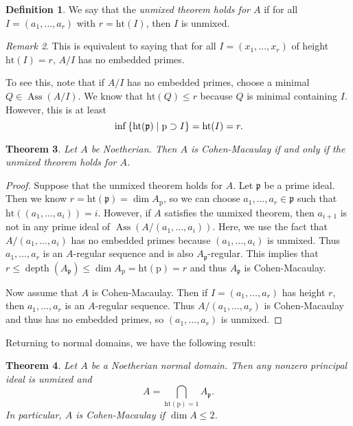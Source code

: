 \documentclass[leqno, openany]{memoir}
\newtheorem{thm}{Theorem}[section]
\theoremstyle{definition}
\newtheorem{defn}[thm]{Definition}
\theoremstyle{remark}
\newtheorem{rmk}[thm]{Remark}
\theoremstyle{plain}
\theoremstyle{definition}
\theoremstyle{remark}
\newcommand{\mf}[1]{\mathfrak{#1}}
\newcommand{\mr}[1]{\mathrm{#1}}
\DeclareMathOperator{\Ass}{Ass}
\DeclareMathOperator{\dpth}{depth}
\begin{document}
\begin{defn}
    We say that the \textit{unmixed theorem holds for $A$} if for all $I = (a_1, \ldots, a_r)$ with $r = \mr{ht}(I)$, then $I$ is unmixed. 
\end{defn}

\begin{rmk}
    This is equivalent to saying that for all $I = (x_1, \ldots, x_r)$ of height $\mr{ht}(I) = r$, $A/I$ has no embedded primes.

    To see this, note that if $A/I$ has no embedded primes, choose a minimal $Q \in \Ass(A/I)$. We know that $\mr{ht}(Q) \leq r$ because $Q$ is minimal containing $I$. However, this is at least
    \[ \inf \qty{ \mr{ht}(\mf{p}) \mid \mr{p} \supset I } = \mr{ht}(I) = r. \]
\end{rmk}

\begin{thm}
    Let $A$ be Noetherian. Then $A$ is Cohen-Macaulay if and only if the unmixed theorem holds for $A$.
\end{thm}

\begin{proof}
    Suppose that the unmixed theorem holds for $A$. Let $\mf{p}$ be a prime ideal. Then we know $r = \mr{ht}(\mf{p}) = \dim A_{\mr{p}}$, so we can choose $a_1, \ldots, a_r \in \mf{p}$ such that $\mr{ht}((a_1, \ldots, a_i)) = i$. However, if $A$ satisfies the unmixed theorem, then $a_{i+1}$ is not in any prime ideal of $\Ass(A/(a_1, \ldots, a_i))$. Here, we use the fact that $A/(a_1, \ldots, a_i)$ has no embedded primes because $(a_1, \ldots, a_i)$ is unmixed. Thus $a_1, \ldots, a_r$ is an $A$-regular sequence and is also $A_{\mf{p}}$-regular. This implies that $r \leq \dpth(A_{\mf{p}}) \leq \dim A_{\mr{p}} = \mr{ht}(\mr{p}) = r$ and thus $A_{\mf{p}}$ is Cohen-Macaulay.

    Now assume that $A$ is Cohen-Macaulay. Then if $I = (a_1, \ldots, a_r)$ has height $r$, then $a_1, \ldots, a_r$ is an $A$-regular sequence. Thus $A/(a_1, \ldots, a_r)$ is Cohen-Macaulay and thus has no embedded primes, so $(a_1, \ldots, a_r)$ is unmixed.
\end{proof}

Returning to normal domains, we have the following result:
\begin{thm}
    Let $A$ be a Noetherian normal domain. Then any nonzero principal ideal is unmixed and
    \[ A = \bigcap_{\mr{ht}(\mr{p}) = 1} A_{\mf{p}}. \]
    In particular, $A$ is Cohen-Macaulay if $\dim A \leq 2$.
\end{thm}
\end{document}
